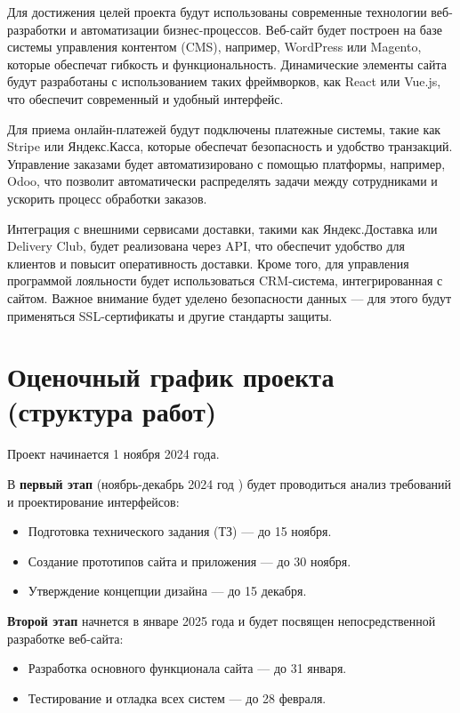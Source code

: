 Для достижения целей проекта будут использованы современные
технологии веб-разработки и автоматизации бизнес-процессов.
Веб-сайт будет построен на базе системы управления контентом (CMS),
например, WordPress или Magento, которые обеспечат гибкость и функциональность.
Динамические элементы сайта будут разработаны
с использованием таких фреймворков, как React или Vue.js,
что обеспечит современный и удобный интерфейс.

Для приема онлайн-платежей будут подключены платежные системы,
такие как Stripe или Яндекс.Касса, которые обеспечат безопасность
и удобство транзакций. Управление заказами будет автоматизировано
с помощью платформы, например, Odoo,
что позволит автоматически распределять задачи между сотрудниками
и ускорить процесс обработки заказов.

Интеграция с внешними сервисами доставки,
такими как Яндекс.Доставка или Delivery Club,
будет реализована через API,
что обеспечит удобство для клиентов и повысит оперативность доставки.
Кроме того, для управления программой лояльности
будет использоваться CRM-система, интегрированная с сайтом.
Важное внимание будет уделено безопасности данных
--- для этого будут применяться SSL-сертификаты и другие стандарты защиты.


\section{Оценочный график проекта (структура работ)}

Проект начинается 1 ноября 2024 года.

В \textbf{первый этап} (ноябрь-декабрь 2024 год
) будет проводиться анализ требований и проектирование интерфейсов:

\begin{itemize}
	\item Подготовка технического задания (ТЗ) --- до 15 ноября.
	\item Создание прототипов сайта и приложения --- до 30 ноября.
	\item Утверждение концепции дизайна --- до 15 декабря.
\end{itemize}

\textbf{Второй этап} начнется в январе 2025 года
и будет посвящен непосредственной разработке веб-сайта:

\begin{itemize}
	\item Разработка основного функционала сайта --- до 31 января.
	\item Тестирование и отладка всех систем --- до 28 февраля.
\end{itemize}

